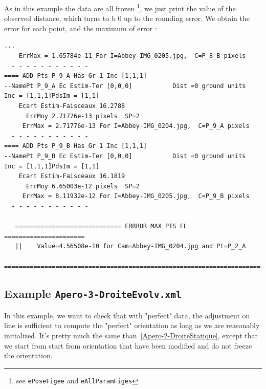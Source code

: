 As in this example the data are all frozen \footnote{see {\tt ePoseFigee} and {\tt eAllParamFiges}}, we just print the
value of the observed distance, which turns to b $0$ up to the rounding error. We obtain the error for each point, and
the maximum of error :


\begin{verbatim}
...
    ErrMax = 1.65784e-11 For I=Abbey-IMG_0205.jpg,  C=P_8_B pixels
  - - - - - - - - - - -
==== ADD Pts P_9_A Has Gr 1 Inc [1,1,1]
--NamePt P_9_A Ec Estim-Ter [0,0,0]           Dist =0 ground units
Inc = [1,1,1]PdsIm = [1,1]
    Ecart Estim-Faisceaux 16.2788
      ErrMoy 2.71776e-13 pixels  SP=2
     ErrMax = 2.71776e-13 For I=Abbey-IMG_0204.jpg,  C=P_9_A pixels
  - - - - - - - - - - -
==== ADD Pts P_9_B Has Gr 1 Inc [1,1,1]
--NamePt P_9_B Ec Estim-Ter [0,0,0]           Dist =0 ground units
Inc = [1,1,1]PdsIm = [1,1]
    Ecart Estim-Faisceaux 16.1819
      ErrMoy 6.65003e-12 pixels  SP=2
     ErrMax = 8.11932e-12 For I=Abbey-IMG_0205.jpg,  C=P_9_B pixels
  - - - - - - - - - - -

   ============================= ERRROR MAX PTS FL ======================
   ||    Value=4.56508e-10 for Cam=Abbey-IMG_0204.jpg and Pt=P_2_A
   ======================================================================
\end{verbatim}


\subsection{Example {\tt Apero-3-DroiteEvolv.xml}}

In this example, we  want to check that with "perfect" data, the adjustment on line
is sufficient to compute the "perfect" orientation as long as we are reasonably initialized.
It's pretty much the same than~\ref{Apero-2-DroiteStatique},
except that we start from start from orientation that have been modified and
do not freeze the orientation.


